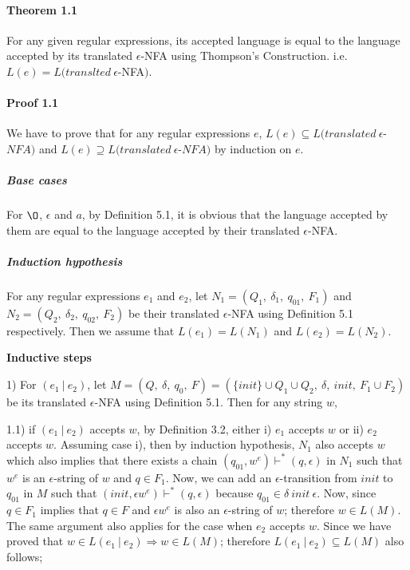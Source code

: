 \paragraph{Theorem 1.1} For any given regular expressions, its accepted
language is equal to the language accepted by its translated
\(\epsilon\)-NFA using Thompson's Construction. i.e. \(L(e) =
L(translted\ \epsilon\)-NFA\()\). 

\paragraph{Proof 1.1} We have to prove that for any regular expressions \(e\), \(L(e) \subseteq
L(translated\ \epsilon\)-\(NFA)\) and \(L(e) \supseteq L(translated\
\epsilon\)-\(NFA)\) by induction on \(e\). 

\subparagraph{Base cases} For \(\O\), \(\epsilon\) and \(a\), by Definition 5.1, it is obvious that the
language accepted by them are equal to the language accepted by their
translated \(\epsilon\)-NFA. 

\subparagraph{Induction hypothesis} For any regular expressions
\(e_1\) and \(e_2\), let \(N_1 =
(Q_1,\ \delta_1,\ q_{01},\ F_1)\) and \(N_2 = (Q_2,\ \delta_2,\
q_{02},\ F_2)\) be their translated \(\epsilon\)-NFA using Definition
5.1 respectively. Then we assume that \(L(e_1) = L(N_1)\) and \(L(e_2) =
L(N_2)\). 
\\
\par \textbf{Inductive steps}
\par 1) For \((e_1\ |\ e_2)\), let \(M = (Q,\ \delta,\ q_0,\ F) = (\{init\} \cup Q_1 \cup Q_2,\
\delta,\ init,\ F_1 \cup F_2)\) be its translated \(\epsilon\)-NFA
using Definition 5.1. Then for any string \(w\), 

\par 1.1) if \((e_1\ |\ e_2)\) accepts \(w\), by Definition 3.2,
either i) \(e_1\) accepts \(w\) or ii) \(e_2\) accepts \(w\). Assuming case i), then by
induction hypothesis, \(N_1\) also accepts \(w\) which also implies
that there exists a chain \((q_{01} , w^e) \vdash^* (q , \epsilon)\) in \(N_1\) such that
\(w^e\) is an \(\epsilon\)-string of \(w\) and \(q \in F_1\). Now, we can
add an \(\epsilon\)-transition from \(init\) to \(q_{01}\) in \(M\)
such that \((init , \epsilon w^e) \vdash^* (q , \epsilon)\)
because \(q_{01} \in \delta\ init\ \epsilon\). Now, since \(q \in
F_1\) implies that \(q \in F\) and \(\epsilon w^e\)
is also an \(\epsilon\)-string of \(w\); therefore \(w \in L(M)\). The same argument also applies
for the case when \(e_2\) accepts \(w\). Since we have proved that \(w \in L(e_1\ |\ e_2)
\Rightarrow w \in L(M)\); therefore \(L(e_1\ |\ e_2) \subseteq L(M)\)
also follows;

